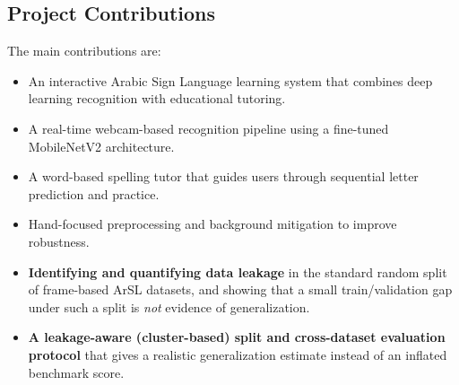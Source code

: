 \subsection{Project Contributions}
The main contributions are:
\begin{itemize}
  \item An interactive Arabic Sign Language learning system that combines deep
        learning recognition with educational tutoring.
  \item A real-time webcam-based recognition pipeline using a fine-tuned
        MobileNetV2 architecture.
  \item A word-based spelling tutor that guides users through sequential letter
        prediction and practice.
  \item Hand-focused preprocessing and background mitigation to improve robustness.
  \item \textbf{Identifying and quantifying data leakage} in the standard random
        split of frame-based ArSL datasets, and showing that a small
        train/validation gap under such a split is \emph{not} evidence of
        generalization.
  \item \textbf{A leakage-aware (cluster-based) split and cross-dataset evaluation
        protocol} that gives a realistic generalization estimate instead of an
        inflated benchmark score.
\end{itemize}
